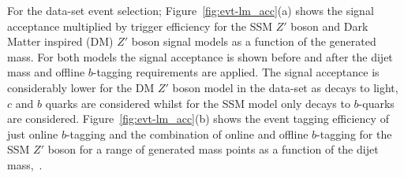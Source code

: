 For the \lm{} data-set event selection;
Figure~\ref{fig:evt-lm_acc}(a) shows the signal acceptance multiplied by trigger efficiency
for the SSM $Z'$ boson and  Dark Matter inspired (DM) $Z'$ boson signal models as a function of the generated mass.
For both models the signal acceptance is shown before and after the
dijet mass and offline $b$-tagging requirements are applied.
The signal acceptance is considerably lower for the DM $Z'$ boson model in the \lm{} data-set
as decays to light, $c$ and $b$ quarks are considered
whilst for the SSM model only decays to $b$-quarks are considered.
Figure~\ref{fig:evt-lm_acc}(b) shows the event tagging efficiency
of just online $b$-tagging and the combination of online and offline $b$-tagging
for the SSM $Z'$ boson for a range of generated mass points
as a function of the dijet mass,~\mjj.


